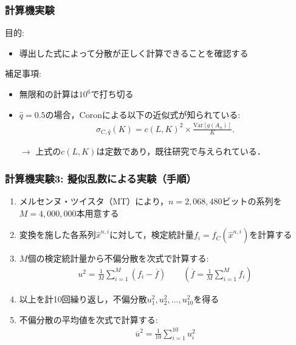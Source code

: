 \documentclass[dvipdfmx,11pt]{beamer}
\begin{document}
\begin{frame}[c]\frametitle{計算機実験}
目的:
\vspace{0.5\baselineskip}
\begin{itemize}
  \item 導出した式によって分散が正しく計算できることを確認する
\end{itemize}
\vspace{\baselineskip}
%
補足事項:
\vspace{0.5\baselineskip}
\begin{itemize}\setlength{\itemsep}{0.5\baselineskip}
  \item 無限和の計算は$10^6$で打ち切る
  \item $\hat{q}=0.5$の場合，Coronによる以下の近似式が知られている:
  \begin{align*}
    \sigma_{C,\hat{q}}(K) = c(L,K)^2 \times \frac{\mathrm{Var}[g(A_n)]}{K}.
  \end{align*}
  \item[$\to$] 上式の$c(L,K)$は定数であり，既往研究で与えられている．
\end{itemize}
%
\end{frame}
\begin{frame}[c]\frametitle{計算機実験3: 擬似乱数による実験（手順）}
\begin{enumerate}\setlength{\itemsep}{.5\baselineskip}
  \item メルセンヌ・ツイスタ（MT）により，$n=2,068,480$ビットの系列を$M=4,000,000$本用意する
  \item 変換を施した各系列$\hat{x}^{n,i}$に対して，検定統計量$f_i=f_C(\hat{x}^{n,i})$を計算する
  \item $M$個の検定統計量から不偏分散を次式で計算する:
  \begin{align*}
    u^2 = \frac{1}{M}\sum_{i=1}^{M} (f_i - \overline{f}) \qquad \left( \overline{f} = \frac{1}{M}\sum_{i=1}^{M} f_i \right)
  \end{align*}
  \item 以上を計10回繰り返し，不偏分散$u_1^2,u_2^2,\dots,u_{10}^2$を得る
  \item 不偏分散の平均値を次式で計算する:
  \begin{align*}
    \overline{u}^2 = \frac{1}{10}\sum_{i=1}^{10} u_i^2
  \end{align*}
\end{enumerate}
\end{frame}
\end{document}

